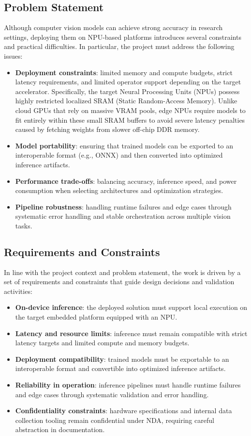 \subsection{Problem Statement}
Although computer vision models can achieve strong accuracy in research settings, deploying them on NPU-based platforms introduces several constraints and practical difficulties. In particular, the project must address the following issues:
\begin{itemize}
  \item \textbf{Deployment constraints}: limited memory and compute budgets, strict latency requirements, and limited operator support depending on the target accelerator. Specifically, the target Neural Processing Units (NPUs) possess highly restricted localized SRAM (Static Random-Access Memory). Unlike cloud GPUs that rely on massive VRAM pools, edge NPUs require models to fit entirely within these small SRAM buffers to avoid severe latency penalties caused by fetching weights from slower off-chip DDR memory.
  \item \textbf{Model portability}: ensuring that trained models can be exported to an interoperable format (e.g., ONNX) and then converted into optimized inference artifacts.
  \item \textbf{Performance trade-offs}: balancing accuracy, inference speed, and power consumption when selecting architectures and optimization strategies.
  \item \textbf{Pipeline robustness}: handling runtime failures and edge cases through systematic error handling and stable orchestration across multiple vision tasks.
\end{itemize}

\subsection{Requirements and Constraints}
In line with the project context and problem statement, the work is driven by a set of requirements and constraints that guide design decisions and validation activities:
\begin{itemize}
  \item \textbf{On-device inference}: the deployed solution must support local execution on the target embedded platform equipped with an NPU.
  \item \textbf{Latency and resource limits}: inference must remain compatible with strict latency targets and limited compute and memory budgets.
  \item \textbf{Deployment compatibility}: trained models must be exportable to an interoperable format and convertible into optimized inference artifacts.
  \item \textbf{Reliability in operation}: inference pipelines must handle runtime failures and edge cases through systematic validation and error handling.
  \item \textbf{Confidentiality constraints}: hardware specifications and internal data collection tooling remain confidential under NDA, requiring careful abstraction in documentation.
\end{itemize}


